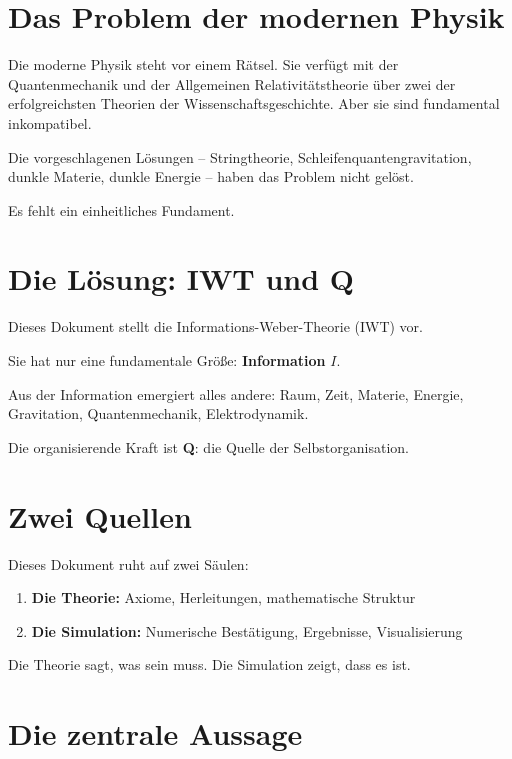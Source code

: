 
\section{Das Problem der modernen Physik}

Die moderne Physik steht vor einem Rätsel. Sie verfügt mit der Quantenmechanik und der Allgemeinen Relativitätstheorie über zwei der erfolgreichsten Theorien der Wissenschaftsgeschichte. Aber sie sind fundamental inkompatibel.

Die vorgeschlagenen Lösungen – Stringtheorie, Schleifenquantengravitation, dunkle Materie, dunkle Energie – haben das Problem nicht gelöst.

Es fehlt ein einheitliches Fundament.

\section{Die Lösung: IWT und Q}

Dieses Dokument stellt die Informations-Weber-Theorie (IWT) vor.

Sie hat nur eine fundamentale Größe: \textbf{Information} \( I \).

Aus der Information emergiert alles andere: Raum, Zeit, Materie, Energie, Gravitation, Quantenmechanik, Elektrodynamik.

Die organisierende Kraft ist \textbf{Q}: die Quelle der Selbstorganisation.

\section{Zwei Quellen}

Dieses Dokument ruht auf zwei Säulen:

\begin{enumerate}
    \item \textbf{Die Theorie:} Axiome, Herleitungen, mathematische Struktur
    \item \textbf{Die Simulation:} Numerische Bestätigung, Ergebnisse, Visualisierung
\end{enumerate}

Die Theorie sagt, was sein muss. Die Simulation zeigt, dass es ist.

\section{Die zentrale Aussage}

